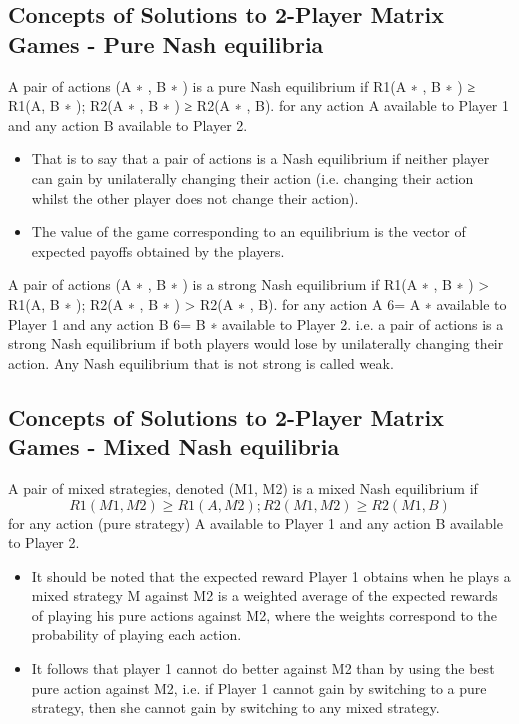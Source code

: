 \documentclass[]{report}
\begin{document}
\subsection{Concepts of Solutions to 2-Player Matrix Games - Pure
Nash equilibria}
A pair of actions (A
∗
, B
∗
) is a pure Nash equilibrium if
R1(A
∗
, B
∗
) ≥ R1(A, B
∗
); R2(A
∗
, B
∗
) ≥ R2(A
∗
, B).
for any action A available to Player 1 and any action B available
to Player 2.
\begin{itemize}
	\item That is to say that a pair of actions is a Nash equilibrium if neither
	player can gain by unilaterally changing their action (i.e. changing
	their action whilst the other player does not change their action).
 \item The value of the game corresponding to an equilibrium is the
	vector of expected payoffs obtained by the players.
\end{itemize}

A pair of actions (A
∗
, B
∗
) is a strong Nash equilibrium if
R1(A
∗
, B
∗
) > R1(A, B
∗
); R2(A
∗
, B
∗
) > R2(A
∗
, B).
for any action A 6= A
∗
available to Player 1 and any action B 6= B
∗
available to Player 2.
i.e. a pair of actions is a strong Nash equilibrium if both players
would lose by unilaterally changing their action.
Any Nash equilibrium that is not strong is called weak.
\subsection{Concepts of Solutions to 2-Player Matrix Games - Mixed
Nash equilibria}
A pair of mixed strategies, denoted (M1, M2) is a mixed Nash
equilibrium if
\[R1(M1, M2) ≥ R1(A, M2); R2(M1, M2) ≥ R2(M1, B)\]
for any action (pure strategy) A available to Player 1 and any
action B available to Player 2.
\begin{itemize}
	\item It should be noted that the expected reward Player 1 obtains when
	he plays a mixed strategy M against M2 is a weighted average of
	the expected rewards of playing his pure actions against M2, where
	the weights correspond to the probability of playing each action.
	\item It follows that player 1 cannot do better against M2 than by using
	the best pure action against M2, i.e. if Player 1 cannot gain by
	switching to a pure strategy, then she cannot gain by switching to
	any mixed strategy.
\end{itemize}
\end{document}

